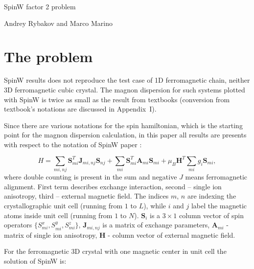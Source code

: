 \documentclass[a4paper,12pt]{article}
\begin{document}
    \begin{center}
    \centering \LARGE SpinW factor 2 problem

    \vspace{1cm}
    \small Andrey Rybakov and Marco Marino
    \end{center}

    \section{The problem}

        SpinW \cite{SpinW} results does not reproduce the test case of 1D ferromagnetic chain, neither 3D ferromagnetic cubic crystal. 
        The magnon dispersion for such systems plotted with SpinW is twice as small as the result from textbooks 
        \cite{rezende2020fundamentals, blundell2003magnetism, gurevich1996magnetization, simon2013oxford, coey2010magnetism, jensen1991rare, white1983quantum} (conversion from textbook's notations are discussed in Appendix~I). 

        Since there are various notations for the spin hamiltonian, which is the starting point for the magnon dispersion calculation, 
        in this paper all results are presents with respect to the notation of SpinW paper \cite{toth2015linear}:

        \begin{equation}
            H = \sum_{mi,nj}\boldsymbol{S}^T_{mi}\boldsymbol{J}_{mi, nj}\boldsymbol{S}_{nj} + 
            \sum_{mi}\boldsymbol{S}^T_{mi}\boldsymbol{A}_{mi}\boldsymbol{S}_{mi} + 
            \mu_B\boldsymbol{H}^T\sum_{mi}g_i\boldsymbol{S}_{mi},
        \end{equation}
        where double counting is present in the sum and negative $J$ means ferromagnetic alignment. 
        First term describes exchange interaction, second -- single ion anisotropy, third -- external magnetic field.
        The indices $m$, $n$ are indexing the crystallographic unit cell (running from $1$ to $L$), while $i$ and $j$ label the magnetic atoms inside unit cell (running from $1$ to $N$).
        $\boldsymbol{S}_i$ is a $3 \times 1$ column vector of spin operators $\{S_{mi}^x, S_{mi}^y, S_{mi}^z\}$, 
        $\boldsymbol{J}_{mi, nj}$ is a matrix of exchange parameters, $\boldsymbol{A}_{mi}$ - matrix of single ion anisotropy,  
        $\boldsymbol{H}$ - column vector of external magnetic field. 

        For the ferromagnetic 3D crystal with one magnetic center in unit cell the solution of SpinW is:
\end{document}
